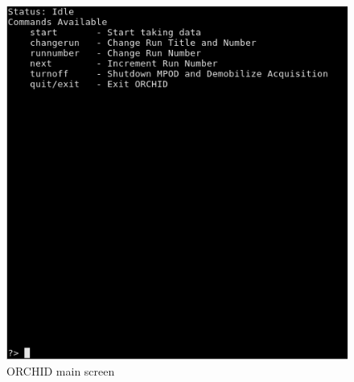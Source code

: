 \documentclass[onecolumn, 10pt, letterpaper, twoside]{article}
\begin{document}
\begin{figure}[h!]
\begin{center}
\includegraphics[width=\textwidth]{./img/Main_Menu.png}
\caption{ORCHID main screen}
\label{fig:ORCHID_Main}
\end{center}
\end{figure}
\end{document}

